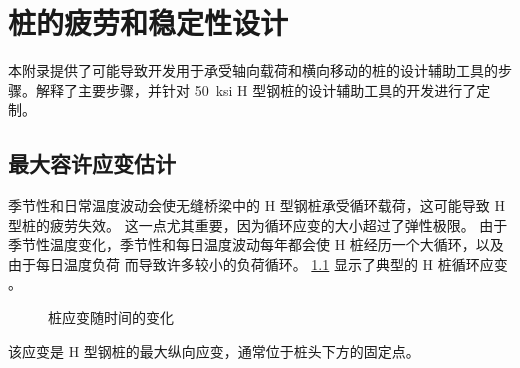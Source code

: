 \chapter{桩的疲劳和稳定性设计}
本附录提供了可能导致开发用于承受轴向载荷和横向移动的桩的设计辅助工具的步骤。解释了主要步骤，并针对 \qty{50}{ksi} H 型钢桩的设计辅助工具的开发进行了定制。
\section{最大容许应变估计}
季节性和日常温度波动会使无缝桥梁中的 H 型钢桩承受循环载荷，这可能导致 H 型桩的疲劳失效。 这一点尤其重要，因为循环应变的大小超过了弹性极限。 由于季节性温度变化，季节性和每日温度波动每年都会使 H 桩经历一个大循环，以及由于每日温度负荷 \cite{dicleli2004e,karalar2010d} 而导致许多较小的负荷循环。 \cref{fig:pile-strain-time} 显示了典型的 H 桩循环应变 \cite{dicleli2004e}。

\begin{figure}
  \caption{桩应变随时间的变化 \cite{dicleli2004e}}
  \label{fig:pile-strain-time}
\end{figure}

该应变是 H 型钢桩的最大纵向应变，通常位于桩头下方的固定点。

